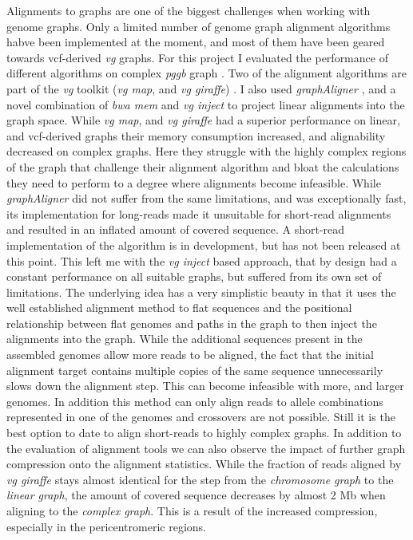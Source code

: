 Alignments to graphs are one of the biggest challenges when working with genome graphs. Only a limited number of genome graph alignment algorithms habve been implemented at the moment, and most of them have been geared towards vcf-derived \textit{vg} graphs. For this project I evaluated the performance of different algorithms on complex \textit{pggb} graph \citep{Garrison2023-lj}. Two of the alignment algorithms are part of the \textit{vg} toolkit (\textit{vg map}, and \textit{vg giraffe}) \citep{Garrison2018-qh}. I also used \textit{graphAligner} \citep{Rautiainen2019-wj}, and a novel combination of \textit{bwa mem} \citep{Li2013-kr} and \textit{vg inject} to project linear alignments into the graph space. While \textit{vg map}, and \textit{vg giraffe} had a superior performance on linear, and vcf-derived graphs their memory consumption increased, and alignability decreased on complex graphs. Here they struggle with the highly complex regions of the graph that challenge their alignment algorithm and bloat the calculations they need to perform to a degree where alignments become infeasible. While \textit{graphAligner} did not suffer from the same limitations, and was exceptionally fast, its implementation for long-reads made it unsuitable for short-read alignments and resulted in an inflated amount of covered sequence. A short-read implementation of the algorithm is in development, but has not been released at this point. This left me with the \textit{vg inject} based approach, that by design had a constant performance on all suitable graphs, but suffered from its own set of limitations. The underlying idea has a very simplistic beauty in that it uses the well established alignment method to flat sequences and the positional relationship between flat genomes and paths in the graph to then inject the alignments into the graph. While the additional sequences present in the assembled genomes allow more reads to be aligned, the fact that the initial alignment target contains multiple copies of the same sequence unnecessarily slows down the alignment step. This can become infeasible with more, and larger genomes. In addition this method can only align reads to allele combinations represented in one of the genomes and crossovers are not possible. Still it is the best option to date to align short-reads to highly complex graphs. \newline
In addition to the evaluation of alignment tools we can also observe the impact of further graph compression onto the alignment statistics. While the fraction of reads aligned by \textit{vg giraffe} stays almost identical for the step from the \textit{chromosome graph} to the \textit{linear graph}, the amount of covered sequence decreases by almost 2 Mb when aligning to the \textit{complex graph}. This is a result of the increased compression, especially in the pericentromeric regions. \newline
